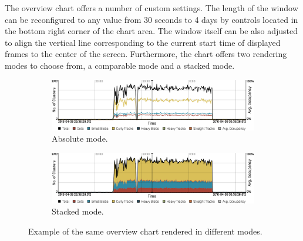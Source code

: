The overview chart offers a number of custom settings. The length of the window can be reconfigured to any value from 30 seconds to 4 days by controls located in the bottom right corner of the chart area. The window itself can be also adjusted to align the vertical line corresponding to the current start time of displayed frames to the center of the screen. Furthermore, the chart offers two rendering modes to choose from, a comparable mode and a stacked mode.

\begin{figure}[t]
\begin{center}

	\begin{subfigure}{\textwidth}
	\includegraphics[width=\textwidth]{figures/overview-absolute}
	\caption{Absolute mode.}
	\label{fig:overview-chart-absolute}
	\end{subfigure}

	\vspace{0.2cm}

	\begin{subfigure}{\textwidth}
	\includegraphics[width=\textwidth]{figures/overview-stacked}
	\caption{Stacked mode.}
	\label{fig:overview-chart-stacked}
	\end{subfigure}

\caption{Example of the same overview chart rendered in different modes.}
\label{fig:overview-chart-modes}
\end{center}
\end{figure}

